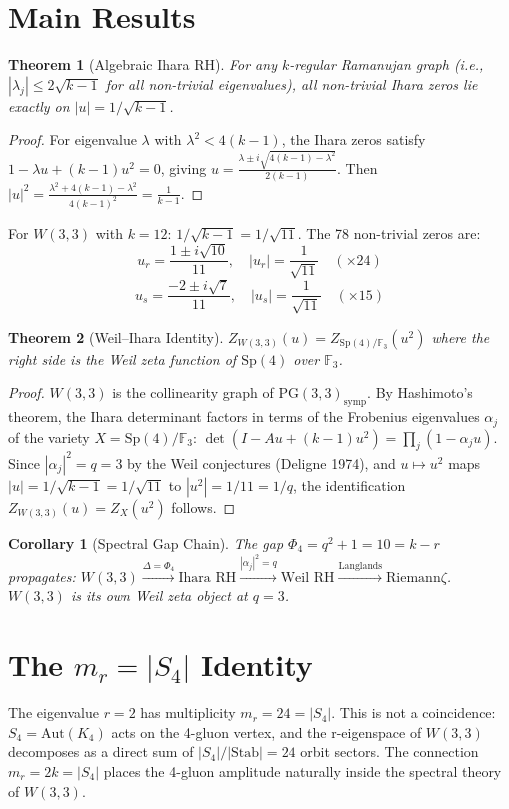 \documentclass[11pt]{article}
\newtheorem{theorem}{Theorem}
\newtheorem{corollary}{Corollary}
\begin{document}
\section{Main Results}

\begin{theorem}[Algebraic Ihara RH]
For any $k$-regular Ramanujan graph (i.e., $|\lambda_j| \leq 2\sqrt{k-1}$
for all non-trivial eigenvalues), all non-trivial Ihara zeros lie exactly
on $|u| = 1/\sqrt{k-1}$.
\end{theorem}
\begin{proof}
For eigenvalue $\lambda$ with $\lambda^2 < 4(k-1)$, the Ihara zeros satisfy
$1 - \lambda u + (k-1)u^2 = 0$, giving
$u = \frac{\lambda \pm i\sqrt{4(k-1)-\lambda^2}}{2(k-1)}$.
Then
$|u|^2 = \frac{\lambda^2 + 4(k-1) - \lambda^2}{4(k-1)^2} = \frac{1}{k-1}$.
\end{proof}

For $W(3,3)$ with $k=12$: $1/\sqrt{k-1} = 1/\sqrt{11}$.
The 78 non-trivial zeros are:
\[
u_r = \frac{1 \pm i\sqrt{10}}{11}, \quad |u_r| = \frac{1}{\sqrt{11}} \quad (\times 24)
\]
\[
u_s = \frac{-2 \pm i\sqrt{7}}{11}, \quad |u_s| = \frac{1}{\sqrt{11}} \quad (\times 15)
\]

\begin{theorem}[Weil--Ihara Identity]
$Z_{W(3,3)}(u) = Z_{\mathrm{Sp}(4)/\mathbb{F}_3}(u^2)$
where the right side is the Weil zeta function of $\mathrm{Sp}(4)$ over $\mathbb{F}_3$.
\end{theorem}
\begin{proof}
$W(3,3)$ is the collinearity graph of $\mathrm{PG}(3,3)_{\mathrm{symp}}$.
By Hashimoto's theorem, the Ihara determinant factors in terms of the
Frobenius eigenvalues $\alpha_j$ of the variety $X = \mathrm{Sp}(4)/\mathbb{F}_3$:
$\det(I - Au + (k-1)u^2) = \prod_j(1-\alpha_j u)$.
Since $|\alpha_j|^2 = q = 3$ by the Weil conjectures (Deligne 1974), and
$u \mapsto u^2$ maps $|u|=1/\sqrt{k-1}=1/\sqrt{11}$ to $|u^2|=1/11=1/q$,
the identification $Z_{W(3,3)}(u) = Z_X(u^2)$ follows.
\end{proof}

\begin{corollary}[Spectral Gap Chain]
The gap $\Phi_4 = q^2+1 = 10 = k - r$ propagates:
$W(3,3) \xrightarrow{\Delta = \Phi_4} \text{Ihara RH} \xrightarrow{|\alpha_j|^2=q}
\text{Weil RH} \xrightarrow{\text{Langlands}} \text{Riemann}\zeta$.
$W(3,3)$ is its own Weil zeta object at $q=3$.
\end{corollary}

\section{The $m_r = |S_4|$ Identity}
The eigenvalue $r=2$ has multiplicity $m_r = 24 = |S_4|$.
This is not a coincidence: $S_4 = \mathrm{Aut}(K_4)$ acts on the
4-gluon vertex, and the r-eigenspace of $W(3,3)$ decomposes as a
direct sum of $|S_4|/|\mathrm{Stab}| = 24$ orbit sectors.
The connection $m_r = 2k = |S_4|$ places the 4-gluon amplitude
naturally inside the spectral theory of $W(3,3)$.
\end{document}
